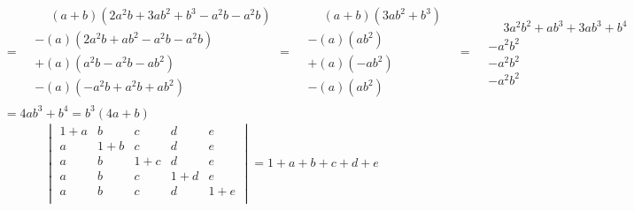     \[
        \begin{aligned}
            &=
            \begin{aligned}
                &\phantom{+}
                (a + b)
                \left(
                    2a^2b + 3ab^2 + b^3
                    - a^2b
                    - a^2b
                \right)
                \\
                &-
                (a)
                \left(
                    2a^2b + ab^2
                    - a^2b
                    - a^2b
                \right)
                \\
                &+
                (a)
                \left(
                    a^2b
                    - a^2b - ab^2
                \right)
                \\
                &-
                (a)
                \left(
                    -a^2b +a^2b + ab^2
                \right)
            \end{aligned}
            =
            \begin{aligned}
                &\phantom{+}
                (a + b)
                \left(
                    3ab^2 + b^3
                \right)
                \\
                &-
                (a)
                \left(
                    ab^2
                \right)
                \\
                &+
                (a)
                \left(
                    -ab^2
                \right)
                \\
                &-
                (a)
                \left(
                    ab^2
                \right)
            \end{aligned}
            &=
            \begin{aligned}
                &\phantom{+}
                3a^2b^2 + ab^3 + 3ab^3 + b^4
                \\
                &-a^2b^2
                \\
                &-a^2b^2
                \\
                &-a^2b^2
            \end{aligned}
            \\[0.25cm]
            &= 4ab^3 + b^4 = b^3\left(4a + b\right)
        \end{aligned}
    \]
    \[
        \begin{vmatrix}
            1 + a & b & c & d & e \\
            a & 1 + b & c & d & e \\
            a & b & 1 + c & d & e \\
            a & b & c & 1 + d & e \\
            a & b & c & d & 1 + e \\
        \end{vmatrix}
        = 
        1 + a + b + c + d + e
    \]
